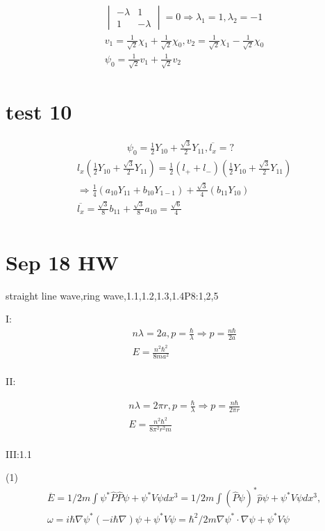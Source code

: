 \documentclass{article}
\begin{document}
 \begin{align*}
  & \begin{vmatrix}-\lambda&1\\1&-\lambda\end{vmatrix}=0 \Rightarrow \lambda_1=1,\lambda_2=-1\\
  &v_1=\frac1{\sqrt{2}}\chi_1+\frac1{\sqrt{2}}\chi_0,v_2=\frac1{\sqrt{2}}\chi_1-\frac1{\sqrt{2}}\chi_0 \\
  & \psi_0=\frac1{\sqrt{2}}v_1+\frac1{\sqrt{2}}v_2
 \end{align*}

 \section{test 10}
 \begin{align*}
  \psi_0=\frac12Y_{10}+\frac{\sqrt{3}}2Y_{11},\overline{l_x}=?
 \end{align*}
  \begin{align*}
  & l_x(\frac12Y_{10}+\frac{\sqrt{3}}2Y_{11})=\frac12(l_++l_-)(\frac12Y_{10}+\frac{\sqrt{3}}2Y_{11})\\
  & \Rightarrow \frac14(a_{10}Y_{11}+b_{10}Y_{1-1})+\frac{\sqrt{3}}4(b_{11}Y_{10}) \\
  & \overline{l_x}=\frac{\sqrt{3}}8b_{11}+\frac{\sqrt{3}}8a_{10}=\frac{\sqrt{6}}4 \\
  \end{align*}

  \section{Sep 18 HW}
    straight line wave,ring wave,1.1,1.2,1.3,1.4P8:1,2,5
  
    I:  \begin{align*}
    &n\lambda=2a,p=\frac{\hbar}{\lambda}\Rightarrow p=\frac{n\hbar}{2a}\\
    &E=\frac{n^2\hbar^2}{8ma^2} \\
    \end{align*}

  II:

  \begin{align*}
    & n\lambda=2\pi r,p=\frac{\hbar}{\lambda}\Rightarrow p=\frac{n\hbar}{2\pi r}\\
    &E=\frac{n^2\hbar^2}{8\pi^2r^2 m} \\
  \end{align*}

  III:1.1

   (1)\begin{align*}
   & \overline {E}=1/2m\int \psi^*\hat P\hat P \psi+\psi^*V\psi d x^3=1/2m\int (\hat P \psi)^*\hat p\psi+\psi^* V\psi dx^3,\\ &\omega=i\hbar \nabla \psi^* (-i\hbar\nabla)\psi+\psi^*V\psi=\hbar^2/2m \nabla\psi^*\cdot \nabla\psi+\psi^*V\psi \\
  \end{align*}
\end{document}
